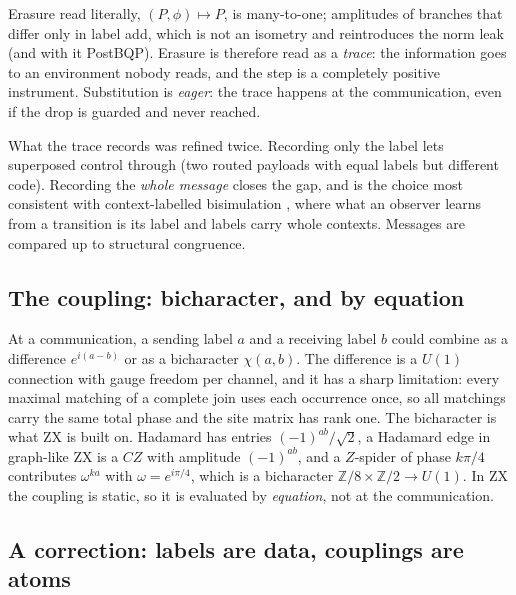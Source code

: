 \documentclass[11pt,a4paper]{article}
\theoremstyle{plain}
\theoremstyle{definition}
\theoremstyle{remark}
\newcommand{\Zt}{\mathbb{Z}/2}
\newcommand{\Ze}{\mathbb{Z}/8}
\begin{document}
Erasure read literally, $(P,\phi)\mapsto P$, is many-to-one; amplitudes of
branches that differ only in label add, which is not an isometry and
reintroduces the norm leak (and with it PostBQP). Erasure is therefore read as
a \emph{trace}: the information goes to an environment nobody reads, and the
step is a completely positive instrument. Substitution is \emph{eager}: the
trace happens at the communication, even if the drop is guarded and never
reached.

What the trace records was refined twice. Recording only the label lets
superposed control through (two routed payloads with equal labels but
different code). Recording the \emph{whole message} closes the gap, and is the
choice most consistent with context-labelled bisimulation \cite{LeiferMilner},
where what an observer learns from a transition is its label and labels carry
whole contexts. Messages are compared up to structural congruence.

\subsection{The coupling: bicharacter, and by equation}

At a communication, a sending label $a$ and a receiving label $b$ could combine
as a difference $e^{i(a-b)}$ or as a bicharacter $\chi(a,b)$. The difference is
a $U(1)$ connection with gauge freedom per channel, and it has a sharp
limitation: every maximal matching of a complete join uses each occurrence
once, so all matchings carry the same total phase and the site matrix has rank
one. The bicharacter is what ZX is built on. Hadamard has entries
$(-1)^{ab}/\sqrt2$, a Hadamard edge in graph-like ZX is a $CZ$ with amplitude
$(-1)^{ab}$, and a $Z$-spider of phase $k\pi/4$ contributes $\omega^{ka}$
with $\omega = e^{i\pi/4}$, which is a bicharacter
$\Ze\times\Zt\to U(1)$. In ZX the coupling is static, so it is evaluated by
\emph{equation}, not at the communication.

\subsection{A correction: labels are data, couplings are atoms}
\end{document}
